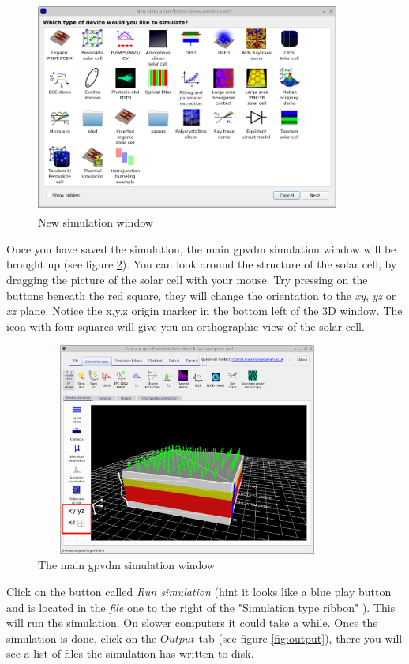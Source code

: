 \begin{figure}[H]
\centering
\includegraphics[width=100mm,height=70mm]{./images/new.png}
\caption{New simulation window}
\label{fig:new_new}
\end{figure}

Once you have saved the simulation, the main gpvdm simulation window will be brought up (see figure \ref{fig:simpleinterface}). You can look around the structure of the solar cell, by dragging the picture of the solar cell with your mouse.  Try pressing on the buttons beneath the red square, they will change the orientation to the \emph{xy}, \emph{yz} or \emph{xz} plane. Notice the x,y,z origin marker in the bottom left of the 3D window.  The icon with four squares will give you an orthographic view of the solar cell.


\begin{figure}[H]
\centering
\includegraphics[width=100mm,height=70mm]{./images/simple_interface.png}
\caption{The main gpvdm simulation window}
\label{fig:simpleinterface}
\end{figure}

Click on the button called \emph{Run simulation} (hint it looks like a blue play button and is located in the \emph{file} one to the right of the "Simulation type ribbon" ).  This will run the simulation.  On slower computers it could take a while. Once the simulation is done, click on the $Output$ tab (see figure \ref{fig:output}), there you will see a list of files the simulation has written to disk.


